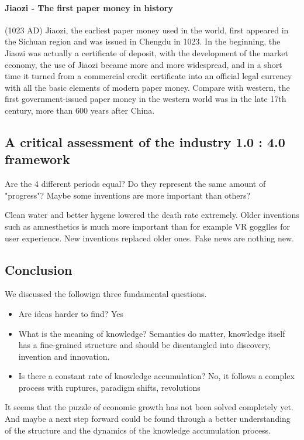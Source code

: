 \paragraph{Jiaozi - The first paper money in history} (1023 AD)
Jiaozi, the earliest paper money used in the world, first appeared in the
Sichuan region and was issued in Chengdu in 1023. In the beginning, the Jiaozi
was actually a certificate of deposit, with the development of the market economy,
the use of Jiaozi became more and more widespread, and in a short time it turned
from a commercial credit certificate into an official legal currency with all the
basic elements of modern paper money. Compare with western, the first
government-issued paper money in the western world was in the late 17th century,
more than 600 years after China.

\subsection{A critical assessment of the industry 1.0 : 4.0 framework}

Are the 4 different periods equal? Do they represent the same amount of "progress"?
Maybe some inventions are more important than others?

\vspace{1\baselineskip}

Clean water and better hygene lowered the death rate extremely. Older inventions
such as amnesthetics is much more important than for example VR gogglles for
user experience. New inventions replaced older ones. Fake news are nothing
new.

\subsection{Conclusion}

We discussed the followign three fundamental questions.
\begin{itemize}
    \item Are ideas harder to find? Yes
    \item What is the meaning of knowledge? Semantics do matter, knowledge
        itself has a fine-grained structure and should be disentangled into
        discovery, invention and innovation.
    \item Is there a constant rate of knowledge accumulation? No, it follows
        a complex process with ruptures, paradigm shifts, revolutions
\end{itemize}
It seems that the puzzle of economic growth has not been solved completely yet.
And maybe a next step forward could be found through a better understanding
of the structure and the dynamics of the knowledge accumulation process.

